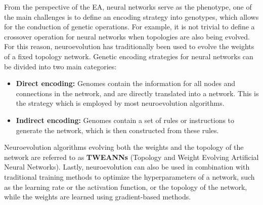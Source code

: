 From the perspective of the EA, neural networks serve as the phenotype, one of the main challenges is to define an encoding strategy into genotypes, which
allows for the conduction of genetic operations. For example, it is not trivial to define a crossover operation for neural networks when topologies are also
being evolved. For this reason, neuroevolution has traditionally  been used to evolve the weights of a fixed topology network. Genetic encoding strategies
for neural networks can be divided into two main categories:

\begin{itemize}
    \item \textbf{Direct encoding:} Genomes contain the information for all nodes and connections in the network, and are directly translated into a network. This
    is the strategy which is employed by most neuroevolution algorithms.
    \item \textbf{Indirect encoding:} Genomes contain a set of rules or instructions to generate the network, which is then constructed from these rules.
\end{itemize}

Neuroevolution algorithms evolving both the weights and the topology of the network are referred to as \textbf{TWEANNs} (Topology and Weight Evolving Artificial Neural Networks).
Lastly, neuroevolution can also be used in combination with traditional training methods to optimize the hyperparameters of a network, such as the learning rate or the
activation function, or the topology of the network, while the weights are learned using gradient-based methods.
